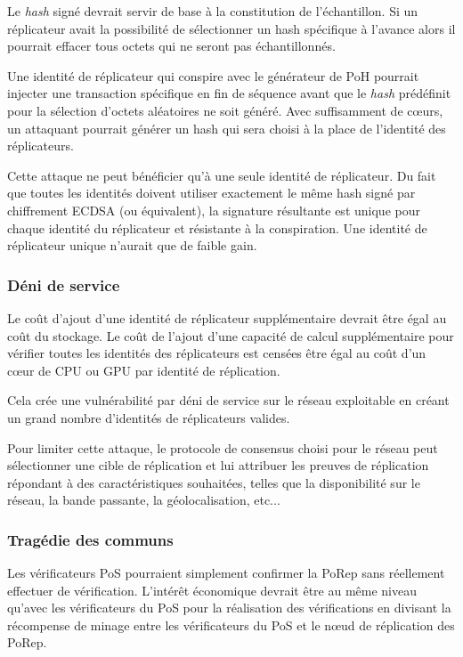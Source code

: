 \documentclass[12pt]{article}
\begin{document}
Le \textit{hash} signé devrait servir de base à la constitution de l'échantillon. Si un réplicateur avait la possibilité de sélectionner un hash spécifique à l'avance alors il pourrait effacer tous octets qui ne seront pas échantillonnés.

Une identité de réplicateur qui conspire avec le générateur de PoH pourrait injecter une transaction spécifique en fin de séquence avant que le \textit{hash} prédéfinit pour la sélection d'octets aléatoires ne soit généré. Avec suffisamment de cœurs, un attaquant pourrait générer un hash qui sera choisi à la place de l’identité des réplicateurs.

Cette attaque ne peut bénéficier qu'à une seule identité de réplicateur. Du fait que toutes les identités doivent utiliser exactement le même hash signé par chiffrement ECDSA (ou équivalent), la signature résultante est unique pour chaque identité du réplicateur et résistante à la conspiration. Une identité de réplicateur unique n'aurait que de faible gain.
\subsubsection{Déni de service}
Le coût d'ajout d'une identité de réplicateur supplémentaire devrait être égal au coût du stockage. Le coût de l'ajout d'une capacité de calcul supplémentaire pour vérifier toutes les identités des réplicateurs est censées être égal au coût d'un cœur de CPU ou GPU par identité de réplication.

Cela crée une vulnérabilité par déni de service sur le réseau exploitable en créant un grand nombre d'identités de réplicateurs valides.

Pour limiter cette attaque, le protocole de consensus choisi pour le réseau peut sélectionner une cible de réplication et lui attribuer les preuves de réplication répondant à des caractéristiques souhaitées, telles que la disponibilité sur le réseau, la bande passante, la géolocalisation, etc...
\subsubsection{Tragédie des communs}

Les vérificateurs PoS pourraient simplement confirmer la PoRep sans réellement effectuer de vérification. L'intérêt économique devrait être au même niveau qu'avec les vérificateurs du PoS pour la réalisation des vérifications en divisant la récompense de minage entre les vérificateurs du PoS et le nœud de réplication des PoRep.
\end{document}
